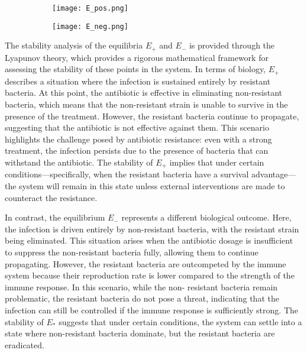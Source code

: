 \begin{figure}
    \centering
    \caption{Equilibria of $E_+$ and $E_-$}
    \begin{subfigure}{0.49\textwidth}\label{fig:epos}
        \centering
        \texttt{[image: E\_pos.png]}
    \end{subfigure}
    \begin{subfigure}{0.49\textwidth}\label{fig:eneg}
        \centering
        \texttt{[image: E\_neg.png]}
    \end{subfigure}
\end{figure}

The stability analysis of the equilibria $E_+$ and $E_-$ is provided through the Lyapunov theory, which provides a rigorous mathematical framework for assessing the stability of these points in the system. In terms of biology, $E_+$ describes a situation where the infection is sustained entirely by resistant bacteria. At this point, the antibiotic is effective in eliminating non-resistant bacteria, which means that the non-resistant strain is unable to survive in the presence of the treatment. However, the resistant bacteria continue to propagate, suggesting that the antibiotic is not effective against them. This scenario highlights the challenge posed by antibiotic resistance: even with a strong treatment, the infection persists due to the presence of bacteria that can withstand the antibiotic. The stability of $E_+$ implies that under certain conditions—specifically, when the resistant bacteria have a survival advantage—the system will remain in this state unless external interventions are made to counteract the resistance.


In contrast, the equilibrium $E_-$ represents a different biological outcome. Here, the infection is driven entirely by non-resistant bacteria, with the resistant strain being eliminated. This situation arises when the antibiotic dosage is insufficient to suppress the non-resistant bacteria fully, allowing them to continue propagating. However, the resistant bacteria are outcompeted by the immune system because their reproduction rate is lower compared to the strength of the immune response. In this scenario, while the non- resistant bacteria remain problematic, the resistant bacteria do not pose a threat, indicating that the infection can still be controlled if the immune response is sufficiently strong. The stability of $E_*$ suggests that under certain conditions, the system can settle into a state where non-resistant bacteria dominate, but the resistant bacteria are eradicated.

